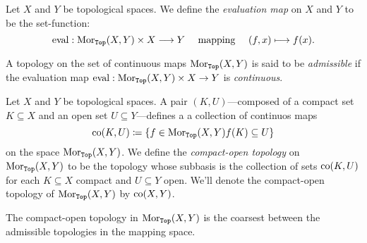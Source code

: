 \begin{definition}
    \label{def:evaluation-map}
    Let \(X\) and \(Y\) be topological spaces. We define the \emph{evaluation map}
    on \(X\) and \(Y\) to be the set-function:
    \[
        \operatorname{eval}: \operatorname{Mor}_{{\texttt{Top}}}(X, Y) \times X \longrightarrow Y
        \quad\text{ mapping }\quad
        (f, x) \longmapsto f(x).
    \]
\end{definition}

\begin{definition}
    \label{def:admissible-topology}
    A topology on the set of continuous maps \(\operatorname{Mor}_{{\texttt{Top}}}(X, Y)\) is said to be
    \emph{admissible} if the evaluation map
    \(\operatorname{eval}: \operatorname{Mor}_{{\texttt{Top}}}(X, Y) \times X \to Y\) is \emph{continuous}.
\end{definition}

\begin{definition}
    \label{def:compact-open-topology}
    Let \(X\) and \(Y\) be topological spaces. A pair \((K, U)\)---composed of a
    compact set \(K \subseteq X\) and an open set \(U \subseteq Y\)---defines a
    a collection of continuos maps
    \[
        \operatorname{co}(K, U) \coloneq \{f \in \operatorname{Mor}_{{\texttt{Top}}}(X, Y) \relax f(K) \subseteq U\}
    \]
    on the space \(\operatorname{Mor}_{{\texttt{Top}}}(X, Y)\). We define the \emph{compact-open topology}
    on \(\operatorname{Mor}_{{\texttt{Top}}}(X, Y)\) to be the topology whose subbasis is the collection of
    sets \(\operatorname{co}(K, U)\) for each \(K \subseteq X\) compact and \(U \subseteq Y\)
    open. We'll denote the compact-open topology of \(\operatorname{Mor}_{{\texttt{Top}}}(X, Y)\) by
    \(\operatorname{co}(X, Y)\).
\end{definition}

\begin{proposition}
    \label{prop:compact-open-is-coarser}
    The compact-open topology in \(\operatorname{Mor}_{{\texttt{Top}}}(X, Y)\) is the coarsest between the
    admissible topologies in the mapping space.
\end{proposition}

